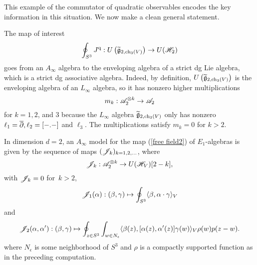 This example of the commutator of quadratic observables encodes the key information in this situation.
We now make a clean general statement.

The map of interest
\[
\oint_{S^3} J^{\rm q} : U\left(\widetilde{\mathfrak g}_{2, {\rm ch}_3(V)}\right) \to U(\mathscr H_{2})
\] 
goes from an $A_\infty$ algebra to the enveloping algebra of a strict dg Lie algebra, which is a strict dg associative algebra. 
Indeed, by definition, $U\left(\widetilde{\mathfrak g}_{2, {\rm ch}_3(V)}\right)$ is the enveloping algebra of an $L_\infty$ algebra, so it has nonzero higher multiplications
\[
m_k : \mathscr A_2^{\otimes k} \to \mathscr A_2 
\] 
for $k = 1, 2$, and $3$ because the $L_\infty$ algebra $\widetilde{\mathfrak g}_{2, {\rm ch}_3(V)}$ only has nonzero $\ell_1 = \overline{\partial}, \ell_2 = [-.-]$ and $\ell_3$. 
The multiplications satisfy $m_k = 0$ for $k > 2$. 

\begin{prop}\label{prop: ainfinty}
In dimension $d = 2$, an $A_\infty$ model for the map (\ref{free field2}) of $E_1$-algebras is given by the sequence of maps $(\mathscr J_k)_{k = 1,2,\ldots}$, where
\[
\mathscr J_k : \mathscr A_2^{\otimes k} \to U(\mathscr H_V)[2-k],
\]
with $\mathscr J_k = 0$ for~$k > 2$,
\[
\mathscr J_1 (\alpha) : (\beta,\gamma) \mapsto \oint_{S^3} \langle\beta, \alpha \cdot \gamma\rangle_V
\]
and 
\[
\mathscr J_2 (\alpha, \alpha') : (\beta,\gamma) \mapsto \oint_{z \in S^3} \int_{w \in N_{\epsilon}}  \langle\beta(z), [\alpha(z),\alpha'(z)] \gamma(w) \rangle_V \rho(w) p(z-w) .
\] 
where $N_\epsilon$ is some neighborhood of $S^3$ and $\rho$ is a compactly supported function as in the  preceding computation. 
\end{prop}

